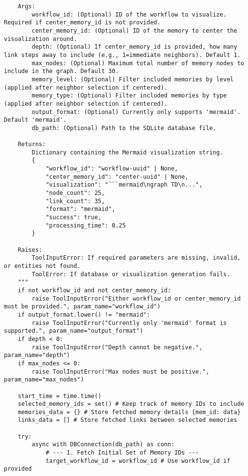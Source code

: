 \documentclass[12pt,a4paper]{article}
\begin{document}
\begin{pageablecode}
\begin{verbatim}
    Args:
        workflow_id: (Optional) ID of the workflow to visualize. Required if center_memory_id is not provided.
        center_memory_id: (Optional) ID of the memory to center the visualization around.
        depth: (Optional) If center_memory_id is provided, how many link steps away to include (e.g., 1=immediate neighbors). Default 1.
        max_nodes: (Optional) Maximum total number of memory nodes to include in the graph. Default 30.
        memory_level: (Optional) Filter included memories by level (applied after neighbor selection if centered).
        memory_type: (Optional) Filter included memories by type (applied after neighbor selection if centered).
        output_format: (Optional) Currently only supports 'mermaid'. Default 'mermaid'.
        db_path: (Optional) Path to the SQLite database file.

    Returns:
        Dictionary containing the Mermaid visualization string.
        {
            "workflow_id": "workflow-uuid" | None,
            "center_memory_id": "center-uuid" | None,
            "visualization": "```mermaid\ngraph TD\n...",
            "node_count": 25,
            "link_count": 35,
            "format": "mermaid",
            "success": true,
            "processing_time": 0.25
        }

    Raises:
        ToolInputError: If required parameters are missing, invalid, or entities not found.
        ToolError: If database or visualization generation fails.
    """
    if not workflow_id and not center_memory_id:
        raise ToolInputError("Either workflow_id or center_memory_id must be provided.", param_name="workflow_id")
    if output_format.lower() != "mermaid":
        raise ToolInputError("Currently only 'mermaid' format is supported.", param_name="output_format")
    if depth < 0:
        raise ToolInputError("Depth cannot be negative.", param_name="depth")
    if max_nodes <= 0:
        raise ToolInputError("Max nodes must be positive.", param_name="max_nodes")

    start_time = time.time()
    selected_memory_ids = set() # Keep track of memory IDs to include
    memories_data = {} # Store fetched memory details {mem_id: data}
    links_data = [] # Store fetched links between selected memories

    try:
        async with DBConnection(db_path) as conn:
            # --- 1. Fetch Initial Set of Memory IDs ---
            target_workflow_id = workflow_id # Use workflow_id if provided


\end{verbatim}
\end{pageablecode}
\end{document}
